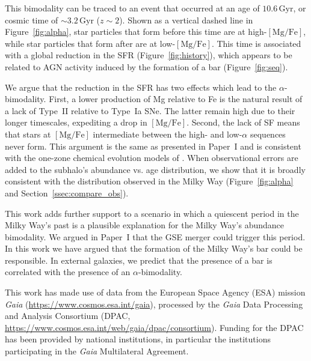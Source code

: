 \documentclass[twocolumn]{aastex631}
\newcommand{\Gyr}{\ensuremath{\textrm{Gyr}}}
\newcommand{\MgFe}{\ensuremath{[\textrm{Mg}/\textrm{Fe}]}}
\begin{document}
This bimodality can be traced to an event that occurred at an age of $10.6\,\Gyr$, or cosmic time of $\sim3.2\,\Gyr$ ($z\sim2$). Shown as a vertical dashed line in Figure~\ref{fig:alpha}, star particles that form before this time are at high-\MgFe{}, while star particles that form after are at low-\MgFe{}. This time is associated with a global reduction in the SFR (Figure~\ref{fig:history}), which appears to be related to AGN activity induced by the formation of a bar (Figure~\ref{fig:seq}).

We argue that the reduction in the SFR has two effects which lead to the $\alpha$-bimodality. First, a lower production of Mg relative to Fe is the natural result of a lack of Type~II relative to Type~Ia SNe. The latter remain high due to their longer timescales, expediting a drop in \MgFe{}. Second, the lack of SF means that stars at \MgFe{} intermediate between the high- and low-$\alpha$ sequences never form. This argument is the same as presented in Paper~I and is consistent with the one-zone chemical evolution models of \citet{2020MNRAS.498.1364J}. When observational errors are added to the subhalo's abundance vs. age distribution, we show that it is broadly consistent with the distribution observed in the Milky Way (Figure~\ref{fig:alpha} and Section~\ref{ssec:compare_obs}).

This work adds further support to a scenario in which a quiescent period in the Milky Way's past is a plausible explanation for the Milky Way's abundance bimodality. We argued in Paper~I that the GSE merger could trigger this period. In this work we have argued that the formation of the Milky Way's bar could be responsible. In external galaxies, we predict that the presence of a bar is correlated with the presence of an $\alpha$-bimodality.

\begin{acknowledgements}
This work has made use of data from the European Space Agency (ESA) mission {\it Gaia} (\url{https://www.cosmos.esa.int/gaia}), processed by the {\it Gaia} Data Processing and Analysis Consortium (DPAC, \url{https://www.cosmos.esa.int/web/gaia/dpac/consortium}). Funding for the DPAC has been provided by national institutions, in particular the institutions participating in the {\it Gaia} Multilateral Agreement.
\end{acknowledgements}

{}


\appendix
\end{document}

